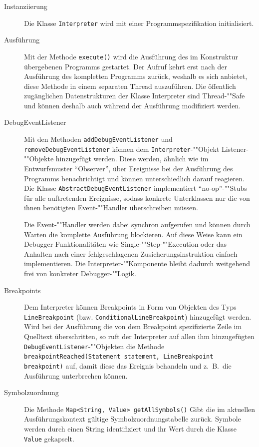 \begin{description}
    \item[Instanziierung] Die Klasse \texttt{Interpreter} wird mit einer Programmspezifikation initialisiert.

    \item[Ausführung] Mit der Methode \texttt{execute()} wird die Ausführung des im Konstruktur übergebenen Programms gestartet. Der Aufruf kehrt erst nach der Ausführung des kompletten Programms zurück, weshalb es sich anbietet, diese Methode in einem separaten Thread auszuführen. Die öffentlich zugänglichen Datenstrukturen der Klasse Interpreter sind Thread-""Safe und können deshalb auch während der Ausführung modifiziert werden.

    \item[DebugEventListener]
    Mit den Methoden \texttt{addDebugEventListener} und \texttt{removeDebugEventListener} können dem \texttt{Interpreter}-""Objekt Listener-""Objekte hinzugefügt werden. Diese werden, ähnlich wie im Entwurfsmuster ``Observer'', über Ereignisse bei der Ausführung des Programms benachrichtigt und können unterschiedlich darauf reagieren. Die Klasse \texttt{AbstractDebugEventListener} implementiert ``no-op''-""Stubs für alle auftretenden Ereignisse, sodass konkrete Unterklassen nur die von ihnen benötigten Event-""Handler überschreiben müssen.

    Die Event-""Handler werden dabei synchron aufgerufen und können durch Warten die komplette Ausführung blockieren. Auf diese Weise kann ein Debugger Funktionalitäten wie Single-""Step-""Execution oder das Anhalten nach einer fehlgeschlagenen Zusicherungsinstruktion einfach implementieren. Die Interpreter-""Komponente bleibt dadurch weitgehend frei von konkreter Debugger-""Logik.

    \item[Breakpoints]
    Dem Interpreter können Breakpoints in Form von Objekten des Typs \texttt{LineBreakpoint} (bzw. \texttt{ConditionalLineBreakpoint}) hinzugefügt werden. Wird bei der Ausführung die von dem Breakpoint spezifizierte Zeile im Quelltext überschritten, so ruft der Interpreter auf allen ihm hinzugefügten \texttt{DebugEventListener}-""Objekten die Methode \texttt{breakpointReached(Statement statement, LineBreakpoint breakpoint)} auf, damit diese das Ereignis behandeln und z.~B.\ die Ausführung unterbrechen können.

    \item[Symbolzuordnung]
    Die Methode \texttt{Map<String, Value> getAllSymbols()} Gibt die im aktuellen Ausführungskontext gültige Symbolzuordnungstabelle zurück. Symbole werden durch einen String identifiziert und ihr Wert durch die Klasse \texttt{Value} gekapselt.


\end{description}
